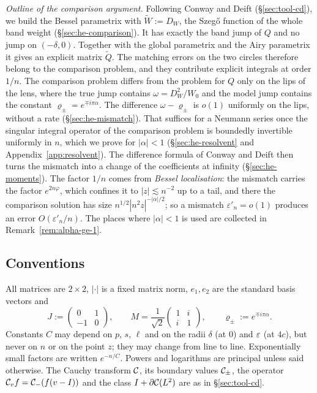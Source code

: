 \emph{Outline of the comparison argument.} Following Conway and Deift (\S\ref{sec:tool-cd}), we build the Bessel
parametrix with $\tilde W:=D_W$, the Szeg\H{o} function of the whole band weight (\S\ref{sec:he-comparison}). It has
exactly the band jump of $Q$ and no jump on $(-\delta,0)$. Together with the global parametrix and the Airy
parametrix it gives an explicit matrix $\tilde Q$. The matching errors on the two circles therefore belong to the
comparison problem, and they contribute explicit integrals at order $1/n$. The comparison problem differs from the problem for $Q$
only on the lips of the lens, where the true jump contains $\omega=D_W^2/W_0$ and the model jump contains the
constant $\varrho_\pm=e^{\mp i\pi\alpha}$. The difference $\omega-\varrho_\pm$ is $o(1)$ uniformly on the lips,
without a rate (\S\ref{sec:he-mismatch}). That suffices for a Neumann series once the singular integral operator of
the comparison problem is boundedly invertible uniformly in $n$, which we prove for $|\alpha|<1$
(\S\ref{sec:he-resolvent} and Appendix~\ref{app:resolvent}). The difference formula of Conway and Deift then turns
the mismatch into a change of the coefficients at infinity (\S\ref{sec:he-moments}). The factor $1/n$ comes from
\emph{Bessel localisation}: the mismatch carries the factor $e^{2n\varphi}$, which confines it to $|z|\lesssim n^{-2}$
up to a tail, and there the comparison solution has size $n^{1/2}|n^2z|^{-|\alpha|/2}$; so a mismatch
$\varepsilon'_n=o(1)$ produces an error $O(\varepsilon'_n/n)$. The places where $|\alpha|<1$ is used are collected in
Remark~\ref{rem:alpha-ge-1}.

\subsection{Conventions}\label{sec:he-conv}

All matrices are $2\times2$, $|\cdot|$ is a fixed matrix norm, $e_1,e_2$ are the standard basis vectors and
\[
  J:=\begin{pmatrix}0&1\\-1&0\end{pmatrix},\qquad M=\frac1{\sqrt2}\begin{pmatrix}1&i\\i&1\end{pmatrix},\qquad
  \varrho_\pm:=e^{\mp i\pi\alpha}.
\]
Constants $C$ may depend on $p$, $s$, $\ell$ and on the radii $\delta$ (at $0$) and $\varepsilon$ (at $4c$), but never
on $n$ or on the point $z$; they may change from line to line. Exponentially small factors are written $e^{-n/C}$.
Powers and logarithms are principal unless said otherwise. The Cauchy transform $\mathcal{C}$, its boundary values
$\mathcal{C}_\pm$, the operator $\mathcal{C}_vf=\mathcal{C}_-(f(v-I))$ and the class $I+\partial\mathcal{C}(L^2)$ are as in \S\ref{sec:tool-cd}.

